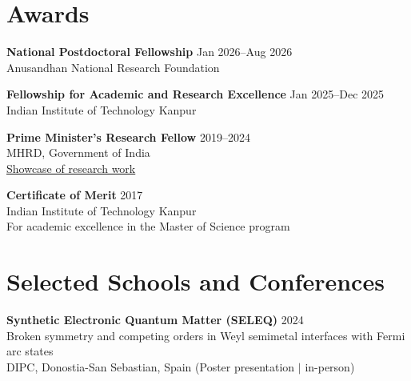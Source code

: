 \documentclass[a4paper,11pt]{article}
\begin{document}
\section*{Awards}
\noindent
\textbf{National Postdoctoral Fellowship} \hfill Jan 2026--Aug 2026 \\
Anusandhan National Research Foundation

\noindent
\textbf{Fellowship for Academic and Research Excellence} \hfill Jan 2025--Dec 2025 \\
Indian Institute of Technology Kanpur

\noindent
\textbf{Prime Minister's Research Fellow} \hfill 2019--2024 \\
MHRD, Government of India\\
\href{https://www.pmrf.in/08-ph-commendable-research-works}{Showcase of research work}

\noindent
\textbf{Certificate of Merit} \hfill 2017 \\
Indian Institute of Technology Kanpur\\
For academic excellence in the Master of Science program
%

\section*{Selected Schools and Conferences}
\noindent
\textbf{Synthetic Electronic Quantum Matter (SELEQ)} \hfill 2024 \\
Broken symmetry and competing orders in Weyl semimetal interfaces with Fermi arc states\\
DIPC, Donostia-San Sebastian, Spain (Poster presentation $\vert$ in-person)
\end{document}
